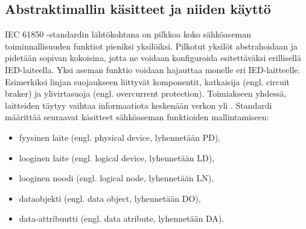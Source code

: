 \subsection{Abstraktimallin käsitteet ja niiden käyttö}
IEC 61850 -standardin lähtökohtana on pilkkoa koko sähköaseman toiminnallisuuden funktiot pieniksi yksilöiksi. Pilkotut yksilöt abstrahoidaan ja pidetään sopivan kokoisina, jotta ne voidaan konfiguroida esitettäväksi erillisellä IED-laiteella. Yksi aseman funktio voidaan hajauttaa monelle eri IED-laitteelle. Esimerkiksi linjan suojaukseen liittyvät komponentit, katkaisija (engl. circuit braker) ja ylivirtasuoja (engl. overcurrent protection). Toimiakseen yhdessä, laitteiden täytyy vaihtaa informaatiota keskenään verkon yli \cite[s.~31]{IEC61850-7-1}. Standardi määrittää seuraavat käsitteet sähköaseman funktioiden mallintamiseen:
\begin{itemize}
	\item fyysinen laite (engl. physical device, lyhennetään PD),
	\item looginen laite (engl. logical device, lyhennetään LD),
	\item looginen noodi (engl. logical node, lyhennetään LN),
	\item dataobjekti (engl. data object, lyhennetään DO),
	\item data-attribuutti (engl. data atribute, lyhennetään DA).
\end{itemize}
